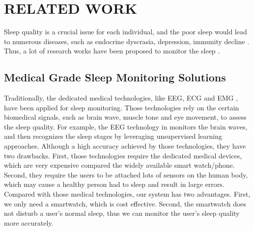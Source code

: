 \section{RELATED WORK}\label{sec:5related}

Sleep quality is a crucial issue for each individual, and the poor sleep would lead to numerous diseases, such as  endocrine dyscrasia, depression, immunity decline \cite{vgontzas2009insomnia,gottlieb2005association}. Thus, a lot of research works have been proposed to monitor the sleep \cite{langkvist2012sleep,hao2013isleep,bai2012will,kay2012lullaby,bain2003evaluation,pombo2016ubisleep}.

\subsection{Medical Grade Sleep Monitoring Solutions}
Traditionally, the dedicated medical technologies, like EEG, ECG and EMG \cite{saper2005hypothalamic}, have been applied for sleep monitoring. Those technologies rely on the certain biomedical signals, such as brain wave, muscle tone and eye movement, to assess the sleep quality. For example, the EEG technology in \cite{langkvist2012sleep,oropesa1999sleep,ebrahimi2008automatic} monitors the brain waves, and then recognizes the sleep stages by leveraging unsupervised learning approaches. Although a high accuracy achieved by those technologies, they have two drawbacks. First, those  technologies require the dedicated medical devices, which are very expensive compared the widely available  smart watch/phone. Second, they require the users to be attached lots of sensors on the human body, which may cause a healthy person had to sleep and result in large errors. Compared with those medical technologies, our system has two advantages. First, we only need a smartwatch, which is cost effective. Second, the smartwatch does not disturb a user's normal sleep, thus we can monitor the user's sleep quality more accurately.

